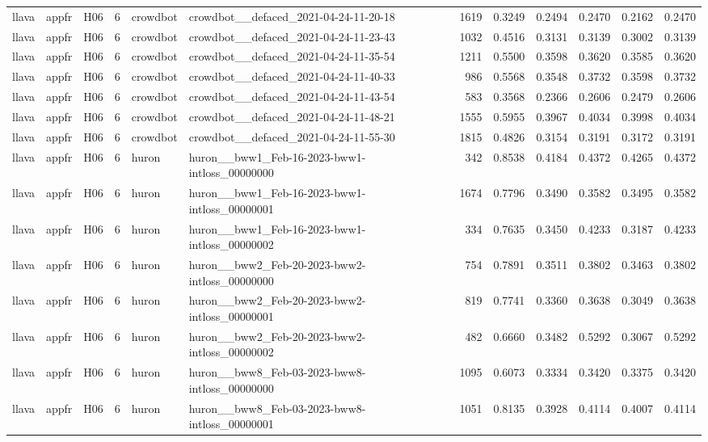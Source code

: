 \begin{table}[tbp]
\begin{tabular}{lllrllrrrrrr}
llava & appfr & H06 & 6 & crowdbot & crowdbot\_\_defaced\_2021-04-24-11-20-18 & 1619 & 0.3249 & 0.2494 & 0.2470 & 0.2162 & 0.2470 \\
llava & appfr & H06 & 6 & crowdbot & crowdbot\_\_defaced\_2021-04-24-11-23-43 & 1032 & 0.4516 & 0.3131 & 0.3139 & 0.3002 & 0.3139 \\
llava & appfr & H06 & 6 & crowdbot & crowdbot\_\_defaced\_2021-04-24-11-35-54 & 1211 & 0.5500 & 0.3598 & 0.3620 & 0.3585 & 0.3620 \\
llava & appfr & H06 & 6 & crowdbot & crowdbot\_\_defaced\_2021-04-24-11-40-33 & 986 & 0.5568 & 0.3548 & 0.3732 & 0.3598 & 0.3732 \\
llava & appfr & H06 & 6 & crowdbot & crowdbot\_\_defaced\_2021-04-24-11-43-54 & 583 & 0.3568 & 0.2366 & 0.2606 & 0.2479 & 0.2606 \\
llava & appfr & H06 & 6 & crowdbot & crowdbot\_\_defaced\_2021-04-24-11-48-21 & 1555 & 0.5955 & 0.3967 & 0.4034 & 0.3998 & 0.4034 \\
llava & appfr & H06 & 6 & crowdbot & crowdbot\_\_defaced\_2021-04-24-11-55-30 & 1815 & 0.4826 & 0.3154 & 0.3191 & 0.3172 & 0.3191 \\
llava & appfr & H06 & 6 & huron & huron\_\_bww1\_Feb-16-2023-bww1-intloss\_00000000 & 342 & 0.8538 & 0.4184 & 0.4372 & 0.4265 & 0.4372 \\
llava & appfr & H06 & 6 & huron & huron\_\_bww1\_Feb-16-2023-bww1-intloss\_00000001 & 1674 & 0.7796 & 0.3490 & 0.3582 & 0.3495 & 0.3582 \\
llava & appfr & H06 & 6 & huron & huron\_\_bww1\_Feb-16-2023-bww1-intloss\_00000002 & 334 & 0.7635 & 0.3450 & 0.4233 & 0.3187 & 0.4233 \\
llava & appfr & H06 & 6 & huron & huron\_\_bww2\_Feb-20-2023-bww2-intloss\_00000000 & 754 & 0.7891 & 0.3511 & 0.3802 & 0.3463 & 0.3802 \\
llava & appfr & H06 & 6 & huron & huron\_\_bww2\_Feb-20-2023-bww2-intloss\_00000001 & 819 & 0.7741 & 0.3360 & 0.3638 & 0.3049 & 0.3638 \\
llava & appfr & H06 & 6 & huron & huron\_\_bww2\_Feb-20-2023-bww2-intloss\_00000002 & 482 & 0.6660 & 0.3482 & 0.5292 & 0.3067 & 0.5292 \\
llava & appfr & H06 & 6 & huron & huron\_\_bww8\_Feb-03-2023-bww8-intloss\_00000000 & 1095 & 0.6073 & 0.3334 & 0.3420 & 0.3375 & 0.3420 \\
llava & appfr & H06 & 6 & huron & huron\_\_bww8\_Feb-03-2023-bww8-intloss\_00000001 & 1051 & 0.8135 & 0.3928 & 0.4114 & 0.4007 & 0.4114 \\

\end{tabular}
\end{table}
